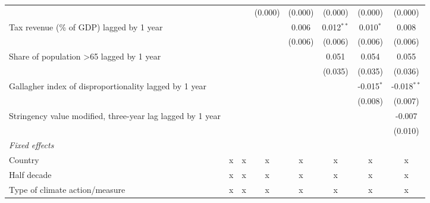 \begin{tabular}{lccccccc}
                                                                               &              &              & (0.000)     & (0.000) & (0.000)      & (0.000)      & (0.000)\\   
   Tax revenue (\% of GDP) lagged by 1 year                                    &              &              &             & 0.006   & 0.012$^{**}$ & 0.010$^{*}$  & 0.008\\   
                                                                               &              &              &             & (0.006) & (0.006)      & (0.006)      & (0.006)\\   
   Share of population >65 lagged by 1 year                                    &              &              &             &         & 0.051        & 0.054        & 0.055\\   
                                                                               &              &              &             &         & (0.035)      & (0.035)      & (0.036)\\   
   Gallagher index of disproportionality lagged by 1 year                      &              &              &             &         &              & -0.015$^{*}$ & -0.018$^{**}$\\   
                                                                               &              &              &             &         &              & (0.008)      & (0.007)\\   
   Stringency value modified, three-year lag lagged by 1 year                  &              &              &             &         &              &              & -0.007\\   
                                                                               &              &              &             &         &              &              & (0.010)\\   
   \emph{Fixed effects}\\
   Country                                                                     & x            & x            & x           & x       & x            & x            & x\\  
   Half decade                                                                 & x            & x            & x           & x       & x            & x            & x\\  
   Type of climate action/measure                                              & x            & x            & x           & x       & x            & x            & x\\  

\end{tabular}
